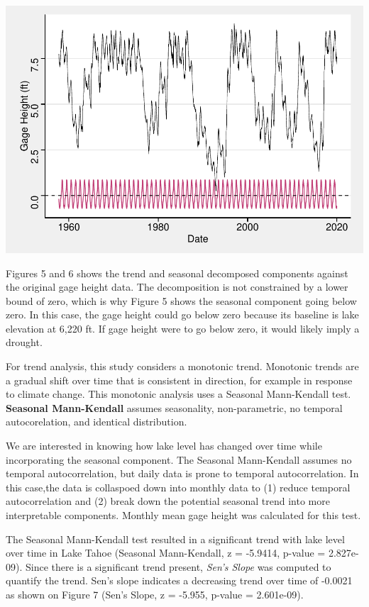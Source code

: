 \documentclass[12pt,]{article}
\let\origfigure\figure
\let\endorigfigure\endfigure
\renewenvironment{figure}[1][2] {
    \expandafter\origfigure\expandafter[H]
} {
    \endorigfigure
}
\begin{document}
\begin{figure}
\centering
\includegraphics{Shintaku_ENV872_Project_files/figure-latex/unnamed-chunk-9-1.pdf}
\caption{Seasonal Component Against Actual Data}
\end{figure}

Figures 5 and 6 shows the trend and seasonal decomposed components
against the original gage height data. The decomposition is not
constrained by a lower bound of zero, which is why Figure 5 shows the
seasonal component going below zero. In this case, the gage height could
go below zero because its baseline is lake elevation at 6,220 ft. If
gage height were to go below zero, it would likely imply a drought.

For trend analysis, this study considers a monotonic trend. Monotonic
trends are a gradual shift over time that is consistent in direction,
for example in response to climate change. This monotonic analysis uses
a Seasonal Mann-Kendall test. \textbf{Seasonal Mann-Kendall} assumes
seasonality, non-parametric, no temporal autocorelation, and identical
distribution.

We are interested in knowing how lake level has changed over time while
incorporating the seasonal component. The Seasonal Mann-Kendall assumes
no temporal autocorrelation, but daily data is prone to temporal
autocorrelation. In this case,the data is collaspoed down into monthly
data to (1) reduce temporal autocorrelation and (2) break down the
potential seasonal trend into more interpretable components. Monthly
mean gage height was calculated for this test.

The Seasonal Mann-Kendall test resulted in a significant trend with lake
level over time in Lake Tahoe (Seasonal Mann-Kendall, z = -5.9414,
p-value = 2.827e-09). Since there is a significant trend present,
\emph{Sen's Slope} was computed to quantify the trend. Sen's slope
indicates a decreasing trend over time of -0.0021 as shown on Figure 7
(Sen's Slope, z = -5.955, p-value = 2.601e-09).
\end{document}
